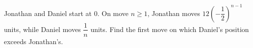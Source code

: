 Jonathan and Daniel start at $0$. On move $n\ge1$, Jonathan moves $12(-\dfrac{1}{2})^{n-1}$ units, while Daniel moves $\dfrac{1}{n}$ units. Find the first move on which Daniel's position exceeds Jonathan's.
